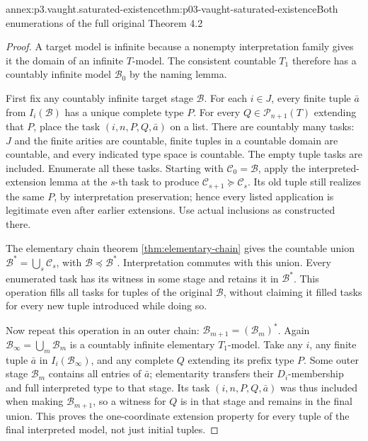 \begin{annexitem}{annex:p3.vaught.saturated-existence}{thm:p03-vaught-saturated-existence}{Both enumerations of the full original Theorem 4.2}
\begin{proof}
A target model is infinite because a nonempty interpretation
family gives it the domain of an infinite \(T\)-model.
The consistent countable \(T_1\) therefore has a countably infinite
model \(\mathcal B_0\) by the naming lemma.

First fix any countably infinite target stage \(\mathcal B\).
For each \(i\in J\), every finite tuple \(\bar a\) from
\(I_i(\mathcal B)\) has a unique complete type \(P\).
For every \(Q\in\mathcal P_{n+1}(T)\) extending that \(P\), place
the task \((i,n,P,Q,\bar a)\) on a list.
There are countably many tasks: \(J\) and the finite arities are
countable, finite tuples in a countable domain are countable,
and every indicated type space is countable.
The empty tuple tasks are included.
Enumerate all these tasks. Starting with \(\mathcal C_0=\mathcal B\),
apply the interpreted-extension lemma at the \(s\)-th task to
produce \(\mathcal C_{s+1}\succeq\mathcal C_s\).
Its old tuple still realizes the same \(P\), by interpretation
preservation; hence every listed application is legitimate even
after earlier extensions. Use actual inclusions as constructed there.

The elementary chain theorem \cref{thm:elementary-chain} gives the
countable union \(\mathcal B^*=\bigcup_s\mathcal C_s\), with
\(\mathcal B\preccurlyeq\mathcal B^*\).
Interpretation commutes with this union.
Every enumerated task has its witness in some stage and retains
it in \(\mathcal B^*\). This operation fills all tasks for tuples
of the original \(\mathcal B\), without claiming it filled tasks
for every new tuple introduced while doing so.

Now repeat this operation in an outer chain:
\(\mathcal B_{m+1}=(\mathcal B_m)^*\).
Again \(\mathcal B_\infty=\bigcup_m\mathcal B_m\) is a countably
infinite elementary \(T_1\)-model.
Take any \(i\), any finite tuple \(\bar a\) in
\(I_i(\mathcal B_\infty)\), and any complete \(Q\) extending its
prefix type \(P\).
Some outer stage \(\mathcal B_m\) contains all entries of \(\bar a\);
elementarity transfers their \(D_i\)-membership and full interpreted
type to that stage. Its task \((i,n,P,Q,\bar a)\) was thus included
when making \(\mathcal B_{m+1}\), so a witness for \(Q\) is in that
stage and remains in the final union.
This proves the one-coordinate extension property for every tuple
of the final interpreted model, not just initial tuples.


\end{proof}
\end{annexitem}
